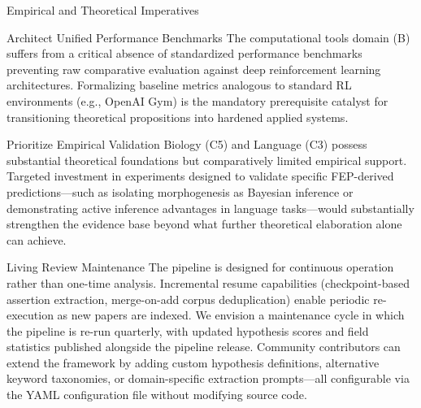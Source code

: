 \documentclass[
  ignorenonframetext,
]{beamer}
\begin{document}
\begin{frame}{Empirical and Theoretical Imperatives}
\protect{}\label{empirical-and-theoretical-imperatives}
\begin{block}{Architect Unified Performance Benchmarks}
\protect{}\label{architect-unified-performance-benchmarks}
The computational tools domain (B) suffers from a critical absence of
standardized performance benchmarks preventing raw comparative
evaluation against deep reinforcement learning architectures.
Formalizing baseline metrics analogous to standard RL environments
(e.g., OpenAI Gym) is the mandatory prerequisite catalyst for
transitioning theoretical propositions into hardened applied systems.
\end{block}

\begin{block}{Prioritize Empirical Validation}
\protect{}\label{prioritize-empirical-validation}
Biology (C5) and Language (C3) possess substantial theoretical
foundations but comparatively limited empirical support. Targeted
investment in experiments designed to validate specific FEP-derived
predictions---such as isolating morphogenesis as Bayesian inference or
demonstrating active inference advantages in language tasks---would
substantially strengthen the evidence base beyond what further
theoretical elaboration alone can achieve.
\end{block}
\end{frame}

\begin{frame}{Living Review Maintenance}
\protect{}\label{living-review-maintenance}
The pipeline is designed for continuous operation rather than one-time
analysis. Incremental resume capabilities (checkpoint-based assertion
extraction, merge-on-add corpus deduplication) enable periodic
re-execution as new papers are indexed. We envision a maintenance cycle
in which the pipeline is re-run quarterly, with updated hypothesis
scores and field statistics published alongside the pipeline release.
Community contributors can extend the framework by adding custom
hypothesis definitions, alternative keyword taxonomies, or
domain-specific extraction prompts---all configurable via the YAML
configuration file without modifying source code.
\end{frame}
\end{document}
